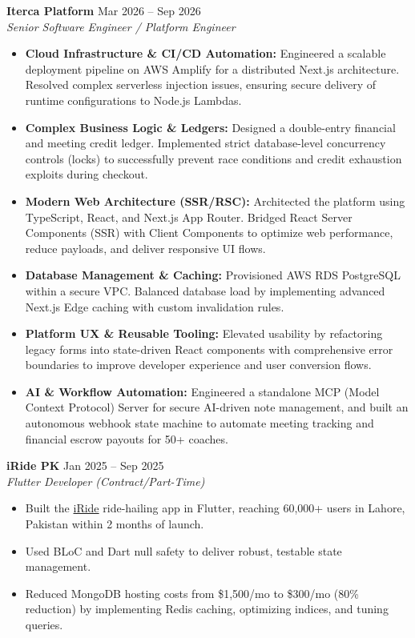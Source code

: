 \documentclass{res} %
\begin{document}
\begin{resume}
  \textbf{Iterca Platform} \hfill Mar 2026 -- Sep 2026\\
  {\sl Senior Software Engineer / Platform Engineer} \smallskip
  \begin{itemize}
    \item \textbf{Cloud Infrastructure \& CI/CD Automation:} Engineered a scalable deployment pipeline on AWS Amplify for a distributed Next.js architecture. Resolved complex serverless injection issues, ensuring secure delivery of runtime configurations to Node.js Lambdas.
    \item \textbf{Complex Business Logic \& Ledgers:} Designed a double-entry financial and meeting credit ledger. Implemented strict database-level concurrency controls (locks) to successfully prevent race conditions and credit exhaustion exploits during checkout.
    \item \textbf{Modern Web Architecture (SSR/RSC):} Architected the platform using TypeScript, React, and Next.js App Router. Bridged React Server Components (SSR) with Client Components to optimize web performance, reduce payloads, and deliver responsive UI flows.
    \item \textbf{Database Management \& Caching:} Provisioned AWS RDS PostgreSQL within a secure VPC. Balanced database load by implementing advanced Next.js Edge caching with custom invalidation rules.
    \item \textbf{Platform UX \& Reusable Tooling:} Elevated usability by refactoring legacy forms into state-driven React components with comprehensive error boundaries to improve developer experience and user conversion flows.
    \item \textbf{AI \& Workflow Automation:} Engineered a standalone MCP (Model Context Protocol) Server for secure AI-driven note management, and built an autonomous webhook state machine to automate meeting tracking and financial escrow payouts for 50+ coaches.
  \end{itemize}


  \textbf{iRide PK} \hfill Jan 2025 -- Sep 2025\\
  {\sl Flutter Developer (Contract/Part-Time)}
  \begin{itemize}
    \item Built the \href{https://apps.apple.com/us/app/iride-drive-and-ride-app/id6480044898}{iRide} ride-hailing app in Flutter, reaching 60,000+ users in Lahore, Pakistan within 2 months of launch.
    \item Used BLoC and Dart null safety to deliver robust, testable state management.
    \item Reduced MongoDB hosting costs from \$1,500/mo to \$300/mo (80\% reduction) by implementing Redis caching, optimizing indices, and tuning queries.
  \end{itemize}


\end{resume}
\end{document}
